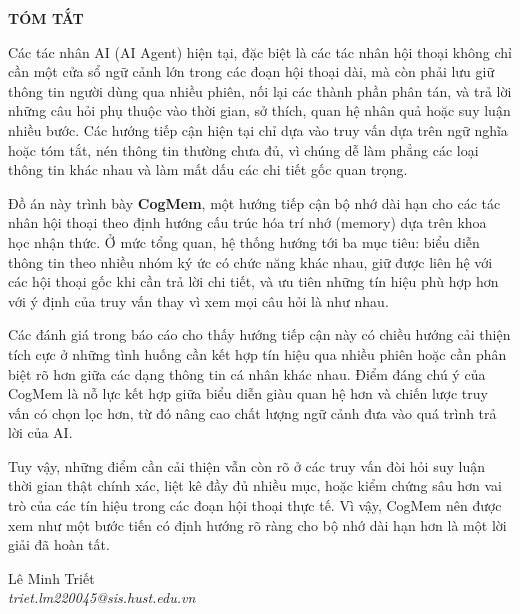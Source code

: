 \documentclass[../main.tex]{subfiles}
\begin{document}
\begin{center}
    \Large{\textbf{TÓM TẮT}}\\
\end{center}
\vspace{0.8cm}

Các tác nhân AI (AI Agent) hiện tại, đặc biệt là các tác nhân hội thoại không chỉ cần một cửa sổ ngữ cảnh lớn trong các đoạn hội thoại dài, mà còn phải lưu giữ thông tin người dùng qua nhiều phiên, nối lại các thành phần phân tán, và trả lời những câu hỏi phụ thuộc vào thời gian, sở thích, quan hệ nhân quả hoặc suy luận nhiều bước. Các hướng tiếp cận hiện tại chỉ dựa vào truy vấn dựa trên ngữ nghĩa hoặc tóm tắt, nén thông tin thường chưa đủ, vì chúng dễ làm phẳng các loại thông tin khác nhau và làm mất dấu các chi tiết gốc quan trọng.

Đồ án này trình bày \textbf{CogMem}, một hướng tiếp cận bộ nhớ dài hạn cho các tác nhân hội thoại theo định hướng cấu trúc hóa trí nhớ (memory) dựa trên khoa học nhận thức. Ở mức tổng quan, hệ thống hướng tới ba mục tiêu: biểu diễn thông tin theo nhiều nhóm ký ức có chức năng khác nhau, giữ được liên hệ với các hội thoại gốc khi cần trả lời chi tiết, và ưu tiên những tín hiệu phù hợp hơn với ý định của truy vấn thay vì xem mọi câu hỏi là như nhau.

Các đánh giá trong báo cáo cho thấy hướng tiếp cận này có chiều hướng cải thiện tích cực ở những tình huống cần kết hợp tín hiệu qua nhiều phiên hoặc cần phân biệt rõ hơn giữa các dạng thông tin cá nhân khác nhau. Điểm đáng chú ý của CogMem là nỗ lực kết hợp giữa biểu diễn giàu quan hệ hơn và chiến lược truy vấn có chọn lọc hơn, từ đó nâng cao chất lượng ngữ cảnh đưa vào quá trình trả lời của AI.

Tuy vậy, những điểm cần cải thiện vẫn còn rõ ở các truy vấn đòi hỏi suy luận thời gian thật chính xác, liệt kê đầy đủ nhiều mục, hoặc kiểm chứng sâu hơn vai trò của các tín hiệu trong các đoạn hội thoại thực tế. Vì vậy, CogMem nên được xem như một bước tiến có định hướng rõ ràng cho bộ nhớ dài hạn hơn là một lời giải đã hoàn tất.

\begin{flushright}
\large Lê Minh Triết\\
\normalsize\textit{triet.lm220045@sis.hust.edu.vn}
\end{flushright}
\end{document}
